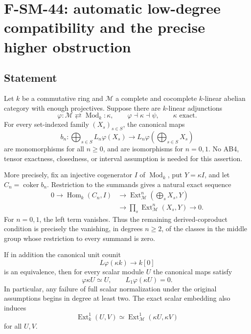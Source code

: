 \section{F-SM-44: automatic low-degree compatibility and the precise higher obstruction}

\subsection{Statement}
Let \(k\) be a commutative ring and \(\mathcal M\) a complete
and cocomplete \(k\)-linear abelian category with enough
projectives.  Suppose there are \(k\)-linear adjunctions
\[
 \varphi:\mathcal M\rightleftarrows\operatorname{Mod}_k:\kappa,
       \qquad \varphi\dashv\kappa\dashv\psi,
       \qquad \kappa\text{ exact}.                           \tag{SM44.1}
\]
For every set-indexed family \((X_s)_{s\in S}\), the canonical
maps
\[
 b_n:\bigoplus_{s\in S}L_n\varphi(X_s)
           \longrightarrow L_n\varphi\!\left(\bigoplus_{s\in S}X_s\right)
                                                               \tag{SM44.2}
\]
are monomorphisms for all \(n\ge0\), and are isomorphisms for
\(n=0,1\).  No AB4, tensor exactness, closedness, or interval
assumption is needed for this assertion.

More precisely, fix an injective cogenerator \(I\) of
\(\operatorname{Mod}_k\), put \(Y=\kappa I\), and let
\(C_n=\operatorname{coker}b_n\).  Restriction to the summands
gives a natural exact sequence
\[
\begin{split}
 0\longrightarrow\operatorname{Hom}_k(C_n,I)
 &\longrightarrow
 \operatorname{Ext}^n_{\mathcal M}\!\left(\bigoplus_sX_s,Y\right)\\
 &\longrightarrow\prod_s\operatorname{Ext}^n_{\mathcal M}(X_s,Y)
       \longrightarrow0 .
\end{split}                                                    \tag{SM44.3}
\]
For \(n=0,1\), the left term vanishes.  Thus the remaining
derived-coproduct condition is precisely the vanishing, in
degrees \(n\ge2\), of the classes in the middle group whose
restriction to every summand is zero.

If in addition the canonical unit counit
\[
                      L\varphi(\kappa k)\longrightarrow k[0]
                                                               \tag{SM44.4}
\]
is an equivalence, then for every scalar module \(U\) the
canonical maps satisfy
\[
         \varphi\kappa U\simeq U,
                    \qquad L_1\varphi(\kappa U)=0.            \tag{SM44.5}
\]
In particular, any failure of full scalar normalization under
the original assumptions begins in degree at least two.
The exact scalar embedding also induces
\[
 \operatorname{Ext}^1_k(U,V)
       \simeq\operatorname{Ext}^1_{\mathcal M}(\kappa U,\kappa V)
                                                               \tag{SM44.6}
\]
for all \(U,V\).

